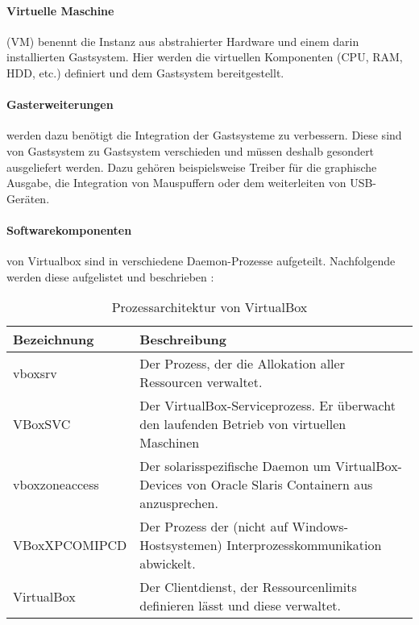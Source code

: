\paragraph{Virtuelle Maschine} (VM) benennt die Instanz aus abstrahierter Hardware und einem
darin installierten Gastsystem. Hier werden die virtuellen Komponenten (CPU, RAM, HDD, etc.)
definiert und dem Gastsystem bereitgestellt.

\paragraph{Gasterweiterungen} werden dazu benötigt die Integration der Gastsysteme zu verbessern.
Diese sind von Gastsystem zu Gastsystem verschieden und müssen deshalb gesondert ausgeliefert werden.
Dazu gehören beispielsweise Treiber für die graphische Ausgabe, die Integration von Mauspuffern
oder dem weiterleiten von USB-Geräten.

\paragraph{Softwarekomponenten} von Virtualbox sind in verschiedene Daemon-Prozesse aufgeteilt.
Nachfolgende werden diese aufgelistet und beschrieben \cite{victor10}:\vspace*{5mm}

\begin{table}
    \begin{tabularx}{\textwidth}{|l||X|}
    \hline
      \textbf{Bezeichnung} & \textbf{Beschreibung} \\
    \hline
    \hline
      vboxsrv & Der Prozess, der die Allokation aller Ressourcen verwaltet. \\
    \hline
    \hline
      VBoxSVC & Der VirtualBox-Serviceprozess. Er überwacht den laufenden Betrieb von virtuellen Maschinen \\
    \hline
    \hline
      vboxzoneaccess & Der solarisspezifische Daemon um VirtualBox-Devices von Oracle Slaris Containern aus anzusprechen. \\
    \hline
    \hline
      VBoxXPCOMIPCD & Der Prozess der (nicht auf Windows-Hostsystemen) Interprozesskommunikation abwickelt. \\
    \hline
    \hline
      VirtualBox & Der Clientdienst, der Ressourcenlimits definieren lässt und diese verwaltet. \\
    \hline
    \end{tabularx}%
    \caption{Prozessarchitektur von VirtualBox}
\end{table}

